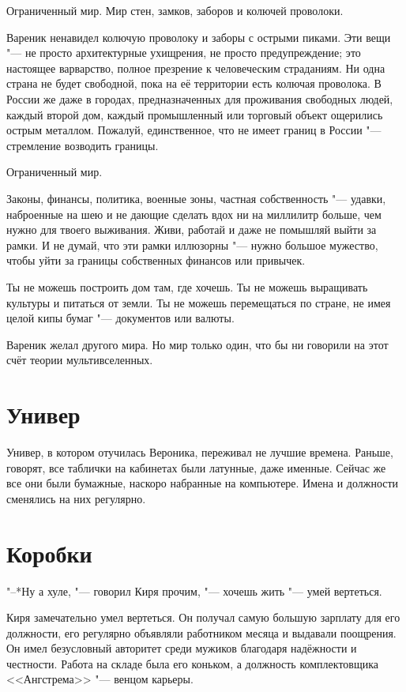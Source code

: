 Ограниченный мир.
Мир стен, замков, заборов и колючей проволоки.

Вареник ненавидел колючую проволоку и заборы с острыми пиками.
Эти вещи "--- не просто архитектурные ухищрения, не просто предупреждение;
это настоящее варварство, полное презрение к человеческим страданиям.
Ни одна страна не будет свободной, пока на её территории есть колючая проволока.
В России же даже в городах, предназначенных для проживания свободных людей, каждый второй дом, каждый промышленный или торговый объект ощерились острым металлом.
Пожалуй, единственное, что не имеет границ в России "--- стремление возводить границы.

Ограниченный мир.

Законы, финансы, политика, военные зоны, частная собственность "--- удавки, наброенные на шею и не дающие сделать вдох ни на миллилитр больше, чем нужно для твоего выживания.
Живи, работай и даже не помышляй выйти за рамки.
И не думай, что эти рамки иллюзорны "--- нужно большое мужество, чтобы уйти за границы собственных финансов или привычек.

Ты не можешь построить дом там, где хочешь. 
Ты не можешь выращивать культуры и питаться от земли.
Ты не можешь перемещаться по стране, не имея целой кипы бумаг "--- документов или валюты.

Вареник желал другого мира.
Но мир только один, что бы ни говорили на этот счёт теории мультивселенных.

\section{Универ}

Универ, в котором отучилась Вероника, переживал не лучшие времена.
Раньше, говорят, все таблички на кабинетах были латунные, даже именные.
Сейчас же все они были бумажные, наскоро набранные на компьютере.
Имена и должности сменялись на них регулярно.

\section{Коробки}

"--*Ну а хуле, "--- говорил Киря прочим, "--- хочешь жить "--- умей вертеться.

Киря замечательно умел вертеться.
Он получал самую большую зарплату для его должности, его регулярно объявляли работником месяца и выдавали поощрения.
Он имел безусловный авторитет среди мужиков благодаря надёжности и честности.
Работа на складе была его коньком, а должность комплектовщика <<Ангстрема>> "--- венцом карьеры.

